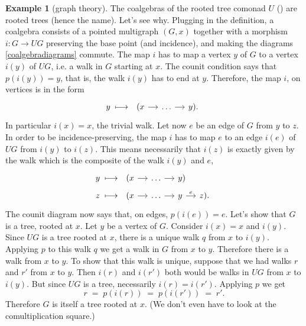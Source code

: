 \documentclass[12pt,oneside]{scrbook}
\numberwithin{equation}{section}
\theoremstyle{plain}
\theoremstyle{definition}
\newtheorem{eg}[thm]{Example}
\newcommand{\ar}[2][]{\arrow{#2}{#1}}
\DeclareMathOperator{\1}{\mathbbm{1}}
\DeclareMathOperator{\2}{\mathbbm{2}}
\begin{document}
\begin{eg}[graph theory]\label{rootedtrees}
 The coalgebras of the rooted tree comonad $U$ () are rooted trees (hence the name). 
 Let's see why. Plugging in the definition, a coalgebra consists of a pointed multigraph $(G,x)$ together with a morphism $i:G\to UG$ preserving the base point (and incidence), and making the diagrams \eqref{coalgebradiagrams} commute. The map $i$ has to map a vertex $y$ of $G$ to a vertex $i(y)$ of $UG$, i.e. a walk in $G$ starting at $x$. The counit condition says that $p(i(y))=y$, that is, the walk $i(y)$ has to end at $y$. Therefore, the map $i$, on vertices is in the form 
 $$
 y \;\longmapsto\; 
 \begin{tikzcd}[sep=small]
  (x \ar{r} &\dots \ar{r} & y ) .
 \end{tikzcd}
 $$
 In particular $i(x)=x$, the trivial walk.
 Let now $e$ be an edge of $G$ from $y$ to $z$. In order to be incidence-preserving, the map $i$ has to map $e$ to an edge $i(e)$ of $UG$ from $i(y)$ to $i(z)$. This means necessarily that $i(z)$ is exactly given by the walk which is the composite of the walk $i(y)$ and $e$,
 \begin{align*}
 y \;&\longmapsto\; 
 \begin{tikzcd}[ampersand replacement=\&, sep=small]
  (x \ar{r} \&\dots \ar{r} \& y )   
 \end{tikzcd} \\
   z \;&\longmapsto\; 
 \begin{tikzcd}[ampersand replacement=\&, sep=small]
  (x \ar{r} \&\dots \ar{r} \& y \ar{r}{e} \& z ) .   
 \end{tikzcd}
 \end{align*}
 The counit diagram now says that, on edges, $p(i(e))=e$.
 Let's show that $G$ is a tree, rooted at $x$. Let $y$ be a vertex of $G$. Consider $i(x)=x$ and $i(y)$. Since $UG$ is a tree rooted at $x$, there is a unique walk $q$ from $x$ to $i(y)$. Applying $p$ to this walk $q$ we get a walk in $G$ from $x$ to $y$. Therefore there is a walk from $x$ to $y$. To show that this walk is unique, suppose that we had walks $r$ and $r'$ from $x$ to $y$. 
 Then $i(r)$ and $i(r')$ both would be walks in $UG$ from $x$ to $i(y)$. But since $UG$ is a tree, necessarily $i(r)=i(r')$. Applying $p$ we get 
 $$
 r \;=\; p(i(r)) \;=\; p(i(r')) \;=\; r' .
 $$
 Therefore $G$ is itself a tree rooted at $x$. 
 (We don't even have to look at the comultiplication square.)
 

\end{eg}
\end{document}
